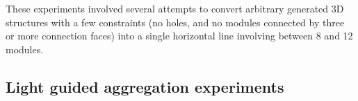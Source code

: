 These experiments involved several attempts to convert arbitrary generated 3D structures with a few constraints (no holes, and no modules connected by three or more connection faces) into a single horizontal line involving between 8 and 12 modules.


\subsection{Light guided aggregation experiments}
\label{sec:mblocksExperimentsLight}

